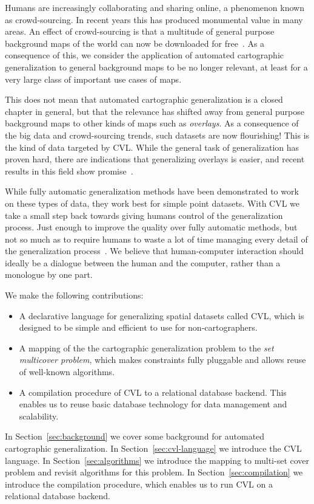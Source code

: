 Humans are increasingly collaborating and sharing online, a phenomenon known as crowd-sourcing. In recent years this has produced monumental value in many areas. An effect of crowd-sourcing is that a multitude of general purpose background maps of the world can now be downloaded for free~\cite{openstreetmap,googlemaps,bingmaps}. As a consequence of this, we consider the application of automated cartographic generalization to general background maps to be no longer relevant, at least for a very large class of important use cases of maps.

This does not mean that automated cartographic generalization is a closed chapter in general, but that the relevance has shifted away from general purpose background maps to other kinds of maps such as \emph{overlays}. As a consequence of the big data and crowd-sourcing trends, such datasets are now flourishing! This is the kind of data targeted by CVL. While the general task of generalization has proven hard, there are indications that generalizing overlays is easier, and recent results in this field show promise~\cite{fusiontables,thatotherpaper}. 


While fully automatic generalization methods have been demonstrated to work on these types of data, they work best for simple point datasets. With CVL we take a small step back towards giving humans control of the generalization process. Just enough to improve the quality over fully automatic methods, but not so much as to require humans to waste a lot of time managing every detail of the generalization process~\cite{fme}. We believe that human-computer interaction should ideally be a dialogue between the human and the computer, rather than a monologue by one part.

We make the following contributions:

\begin{itemize}
\item A declarative language for generalizing spatial datasets called CVL, which is designed to be simple and efficient to use for non-cartographers. 
\item A mapping of the the cartographic generalization problem to the \emph{set multicover problem}, which makes constraints fully pluggable and allows reuse of well-known algorithms.
\item A compilation procedure of CVL to a relational database backend. This enables us to reuse basic database technology for data management and scalability.
\end{itemize}

In Section~\ref{sec:background} we cover some background for automated cartographic generalization. In Section~\ref{sec:cvl-language} we introduce the CVL language. In Section~\ref{sec:algorithms} we introduce the mapping to multi-set cover problem and revisit algorithms for this problem. In Section~\ref{sec:compilation} we introduce the compilation procedure, which enables us to run CVL on a relational database backend.